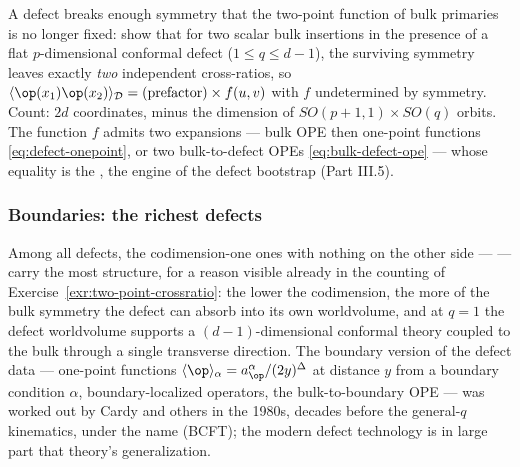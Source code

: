 \begin{exercise}[medium]
\label{exr:two-point-crossratio}
A defect breaks enough symmetry that the two-point function of bulk
primaries is no longer fixed: show that for two scalar bulk insertions
in the presence of a flat $p$-dimensional conformal defect ($1 \le q
\le d-1$), the surviving symmetry leaves exactly \emph{two} independent
cross-ratios, so
$\langle\op(x_1)\op(x_2)\rangle_{\mathcal D} = (\text{prefactor})
\times f(u, v)$ with $f$ undetermined by symmetry. Count: $2d$
coordinates, minus the dimension of $SO(p{+}1,1)\times SO(q)$ orbits.
The function $f$ admits two expansions --- bulk OPE then one-point
functions \eqref{eq:defect-onepoint}, or two bulk-to-defect OPEs
\eqref{eq:bulk-defect-ope} --- whose equality is the , the engine of the defect bootstrap (Part III.5).
\end{exercise}

\subsubsection{Boundaries: the richest defects}
\label{sec:boundaries}

Among all defects, the codimension-one ones with nothing on the other
side ---  --- carry the most structure, for a reason
visible already in the counting of Exercise~\ref{exr:two-point-crossratio}:
the lower the codimension, the more of the bulk symmetry the defect can
absorb into its own worldvolume, and at $q = 1$ the defect worldvolume
supports a $(d{-}1)$-dimensional conformal theory coupled to the bulk
through a single transverse direction. The boundary version of the
defect data --- one-point functions $\langle\op\rangle_\alpha =
a^\alpha_\op/(2y)^{\Delta}$ at distance $y$ from a boundary condition
$\alpha$, boundary-localized operators, the bulk-to-boundary OPE ---
was worked out by Cardy and others in the 1980s, decades before the
general-$q$ kinematics, under the name  (BCFT); the modern defect technology is in large part that
theory's generalization.

